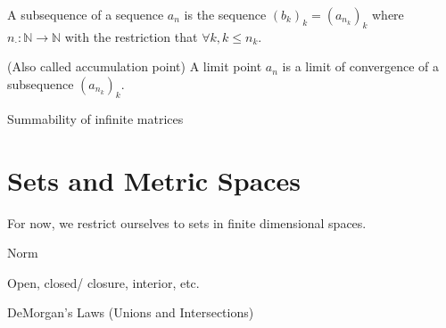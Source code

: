 \begin{definition}[Subsequence]
    A subsequence of a sequence $a_n$ is the sequence $(b_k)_k=(a_{n_k})_k$ where $n_\cdot:\mathbb{N}\rightarrow\mathbb{N}$ with the restriction that $\forall k, k\leq n_k.$
\end{definition}

\begin{definition}
    (Also called accumulation point) A limit point $a_n$ is a limit of convergence of a subsequence $(a_{n_k})_k$.
\end{definition}

\begin{theorem}
\end{theorem}

\begin{lemma}
\end{lemma}


\begin{theorem}
\end{theorem}

\begin{theorem}
Summability of infinite matrices
\end{theorem}

\begin{theorem}
\end{theorem}

\section{Sets and Metric Spaces}

For now, we restrict ourselves to sets in finite dimensional spaces.

Norm

\begin{theorem}
\end{theorem}

Open, closed/ closure, interior, etc.

DeMorgan's Laws (Unions and Intersections)

